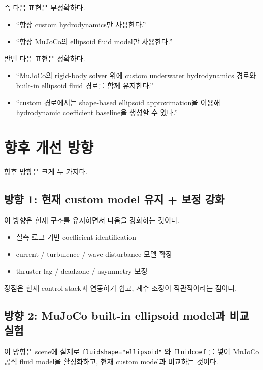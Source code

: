 \documentclass[11pt,a4paper]{article}
\begin{document}
즉 다음 표현은 부정확하다.

\begin{itemize}[leftmargin=2em]
  \item ``항상 custom hydrodynamics만 사용한다.''
  \item ``항상 MuJoCo의 ellipsoid fluid model만 사용한다.''
\end{itemize}

반면 다음 표현은 정확하다.

\begin{itemize}[leftmargin=2em]
  \item ``MuJoCo의 rigid-body solver 위에 custom underwater hydrodynamics 경로와 built-in ellipsoid fluid 경로를 함께 유지한다.''
  \item ``custom 경로에서는 shape-based ellipsoid approximation을 이용해 hydrodynamic coefficient baseline을 생성할 수 있다.''
\end{itemize}

\section{향후 개선 방향}

향후 방향은 크게 두 가지다.

\subsection{방향 1: 현재 custom model 유지 + 보정 강화}

이 방향은 현재 구조를 유지하면서 다음을 강화하는 것이다.

\begin{itemize}[leftmargin=2em]
  \item 실측 로그 기반 coefficient identification
  \item current / turbulence / wave disturbance 모델 확장
  \item thruster lag / deadzone / asymmetry 보정
\end{itemize}

장점은 현재 control stack과 연동하기 쉽고, 계수 조정이 직관적이라는 점이다.

\subsection{방향 2: MuJoCo built-in ellipsoid model과 비교 실험}

이 방향은 scene에 실제로 \texttt{fluidshape="ellipsoid"} 와 \texttt{fluidcoef} 를 넣어 MuJoCo 공식 fluid model을 활성화하고, 현재 custom model과 비교하는 것이다.
\end{document}
